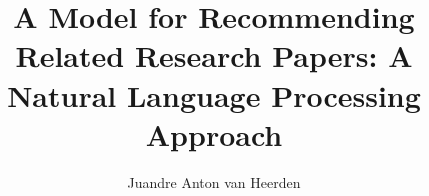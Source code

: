 \documentclass[mtech,copromote]{PETthesis}
\title{A Model for Recommending Related Research Papers: A Natural Language Processing Approach}
\author{Juandre Anton van Heerden}        %
\begin{document}

\theoremstyle{plain}               %
\newtheorem{cav}{Caveat}           %
\theoremstyle{remark}              %
\newtheorem{sol}{Solution}         %

\maketitle


\frontmatter           %
\tableofcontents

\listoftables

\listoffigures

\lstlistoflistings

\mainmatter            %

\end{document}
